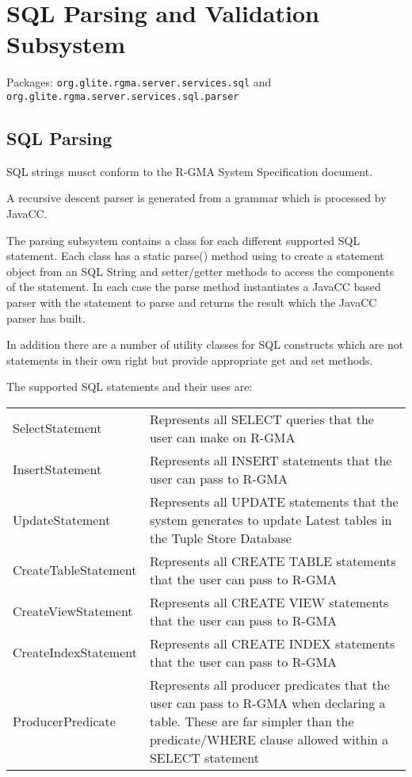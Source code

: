 \section{SQL Parsing and Validation Subsystem}
\label{sec:parsingAndValidationSubsystem}

Packages: \texttt{org.glite.rgma.server.services.sql} and \texttt{org.glite.rgma.server.services.sql.parser}

\subsection{SQL Parsing}

SQL strings musct conform to the  R-GMA System
Specification document.

A recursive descent parser is generated from a grammar which is
processed by JavaCC.

The parsing subsystem contains a class for each different supported
SQL statement.  Each class has a static parse() method using to create
a statement object from an SQL String and setter/getter methods to
access the components of the statement. In each case the parse method
instantiates a JavaCC based parser with the statement to parse and
returns the result which the JavaCC parser has built.

In addition there are a number of utility classes for SQL constructs
which are not statements in their own right but provide appropriate
get and set methods.

The supported SQL statements and their uses are:

\begin{tabular}{l p{12cm}}

SelectStatement &
Represents all SELECT queries that the user can make on R-GMA \\[1mm]

InsertStatement &
Represents all INSERT statements that the user can pass to R-GMA\\[1mm]

UpdateStatement &
Represents all UPDATE statements that the system generates to 
update Latest tables in the Tuple Store Database\\[1mm]

CreateTableStatement &
Represents all CREATE TABLE statements that the user can pass to R-GMA\\[1mm]

CreateViewStatement &
Represents all CREATE VIEW statements that the user can pass to R-GMA\\[1mm]

CreateIndexStatement &
Represents all CREATE INDEX statements that the user can pass to R-GMA\\[1mm]

ProducerPredicate &
Represents all producer predicates that the user can pass to R-GMA when
declaring a table.  These are far simpler than the predicate/WHERE clause
allowed within a SELECT statement\\[2mm]

\end{tabular}


